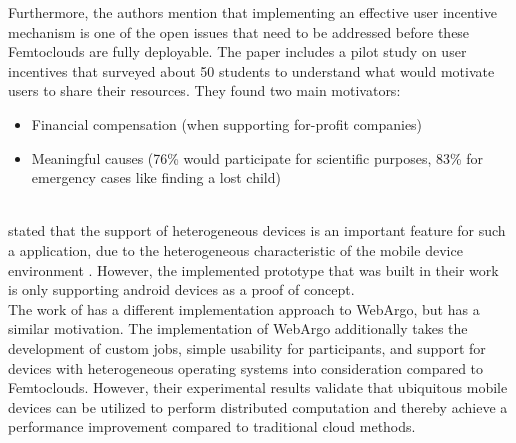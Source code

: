 Furthermore, the authors mention that implementing an effective user incentive mechanism is one of the open issues that need to be addressed before these Femtoclouds are fully deployable. The paper includes a pilot study on user incentives that surveyed about 50 students to understand what would motivate users to share their resources. They found two main motivators:
\begin{itemize}
  \item Financial compensation (when supporting for-profit companies) \cite{relatedwork:mobilecloud}
  \item Meaningful causes (76\% would participate for scientific purposes, 83\% for emergency cases like finding a lost child) \cite{relatedwork:mobilecloud}
\end{itemize}
~\\
\citeauthor{relatedwork:mobilecloud} stated that the support of heterogeneous devices is an important feature for such a application, due to the heterogeneous characteristic of the mobile device environment \cite{relatedwork:mobilecloud}. However, the implemented prototype that was built in their work is only supporting android devices as a proof of concept.
\clearpage
~\\
The work of \citeauthor{relatedwork:mobilecloud} has a different implementation approach to WebArgo, but has a similar motivation. The implementation of WebArgo additionally takes the development of custom jobs, simple usability for participants, and support for devices with heterogeneous operating systems into consideration compared to Femtoclouds. However, their experimental results validate that ubiquitous mobile devices can be utilized to perform distributed computation and thereby achieve a performance improvement compared to traditional cloud methods.
